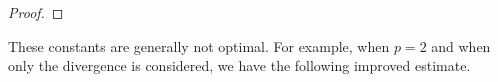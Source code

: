 \documentclass[10pt,a4paper]{article}
\begin{document}
\begin{proof}
\begin{comment}
    
    \color{blue}
    Let $u \in W^{p}_{0}\Alt^{\mia}(\Omega)$ with $0 \leq \mia \leq n-1$ and set $w = \Bogov_{\mia} \cartan u$.
    There exists a sequence $u_{i} \in C^{\infty}_{c}\Alt^{\mia}(\overline\Omega)$ that converges to $u$ in $W^{p}\Alt^{\mia}(\Omega)$. 
    For any test form $v \in C^{\infty}\Alt^{n-\mia-1}(\Omega)$, we verify 
    \begin{align*}
        \int_{\Omega} \cartan v \wedge \Bogov_{\mia+1} \cartan u_{i}
        =
        \int_{\Omega} v \wedge \cartan \Bogov_{\mia+1} \cartan u_{i}
        =
        \int_{\Omega} v \wedge \cartan u_{i}
        .
    \end{align*}
    By the continuity of bounded linear functionals, we find 
    \begin{align*}
        \int_{\Omega} v \wedge \cartan u 
        &=
        (-1)^{\mia(n-\mia)+1}
        \int_{\Omega} \cartan v \wedge w
        .
    \end{align*}
    By definition, $w \in W^{p}_{0}\Alt^{\mia-1}(\Omega)$ with $\cartan w = u$.
    \color{black}
\end{comment}
\end{proof}




These constants are generally not optimal. 
For example, when $p=2$ and when only the divergence is considered, 
we have the following improved estimate. 
\end{document}
